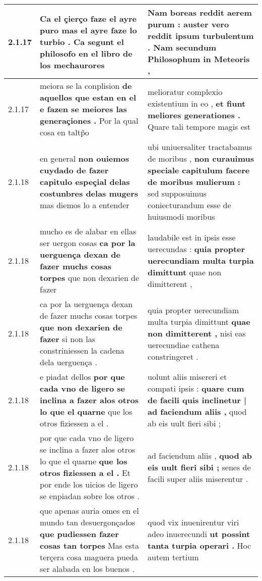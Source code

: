 \begin{tabular}{|p{1cm}|p{6.5cm}|p{6.5cm}|}
2.1.17 & Ca el çierço faze el ayre puro \textbf{ mas el ayre faze lo turbio . } Ca segunt el philosofo en el libro de los mechaurores & Nam boreas reddit aerem purum : \textbf{ auster vero reddit ipsum turbulentum . } Nam secundum Philosophum in Meteoris , \\\hline
2.1.17 & meiora se la conplision \textbf{ de aquellos que estan en el e fazen se meiores las generaçiones . } Por la qual cosa en taltp̃o & melioratur complexio existentium in eo , \textbf{ et fiunt meliores generationes . } Quare tali tempore magis est \\\hline
2.1.18 & en general \textbf{ non ouiemos cuydado de fazer capitulo espeçial delas costunbres delas mugers } mas diemos lo a entender & ubi uniuersaliter tractabamus de moribus , \textbf{ non curauimus speciale capitulum facere de moribus mulierum : } sed supposuimus coniecturandum esse de huiusmodi moribus \\\hline
2.1.18 & mucho es de alabar en ellas ser uergon cosas \textbf{ ca por la uerguença dexan de fazer muchs cosas torpes } que non dexarien de fazer & laudabile est in ipsis esse uerecundas : \textbf{ quia propter uerecundiam multa turpia dimittunt } quae non dimitterent , \\\hline
2.1.18 & ca por la uerguença dexan de fazer muchs cosas torpes \textbf{ que non dexarien de fazer } si non las constriniessen la cadena dela uerguença . & quia propter uerecundiam multa turpia dimittunt \textbf{ quae non dimitterent , } nisi eas uerecundiae cathena constringeret . \\\hline
2.1.18 & e piadat dellos \textbf{ por que cada vno de ligero se inclina a fazer alos otros lo que el quarne } que los otros fiziessen a el . & uolunt aliis misereri et compati ipsis : \textbf{ quare cum de facili quis inclinetur | ad faciendum aliis , } quod ab eis uult fieri sibi ; \\\hline
2.1.18 & por que cada vno de ligero se inclina a fazer alos otros lo que el quarne \textbf{ que los otros fiziessen a el . } Et por ende los uicios de ligero se enpiadan sobre los otros . & ad faciendum aliis , \textbf{ quod ab eis uult fieri sibi ; } senes de facili super aliis miserentur . \\\hline
2.1.18 & que apenas auria omes en el mundo tan desuergonçados \textbf{ que pudiessen fazer cosas tan torpes } Mas esta terçera cosa maguera pueda ser alabada en los buenos . & quod vix inuenirentur viri adeo inuerecundi \textbf{ ut possint tanta turpia operari . } Hoc autem tertium \\\hline

\end{tabular}

